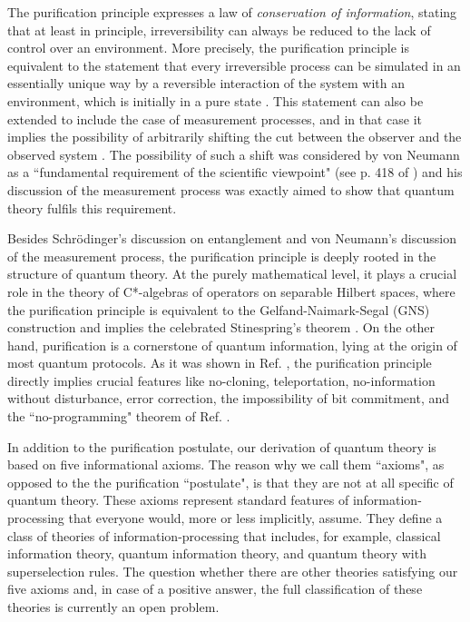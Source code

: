 \documentclass[12pt,aps,pra,showpacs,groupedaddress]{revtex4-1}
\begin{document}
The purification principle expresses a law of \emph{conservation of information}, stating that at
least in principle, irreversibility can always be reduced to the lack of control over an
environment. More precisely, the purification principle is equivalent to the statement that every
irreversible process can be simulated in an essentially unique way by a reversible interaction of
the system with an environment, which is initially in a pure state \cite{purification}.  This
statement can also be extended to include the case of measurement processes, and in that case it
implies the possibility of arbitrarily shifting the cut between the observer and the observed system
\cite{purification}.  The possibility of such a shift was considered by von Neumann as a
``fundamental requirement of the scientific viewpoint" (see p. 418 of \cite{von32}) and his
discussion of the measurement process was exactly aimed to show that quantum theory fulfils this
requirement.


Besides Schr\"odinger's discussion on entanglement and von Neumann's discussion of the measurement process, the purification principle is deeply rooted in
the structure of quantum theory.  At the purely mathematical level, it plays a crucial role in the
theory of C*-algebras of operators on separable Hilbert spaces, where the purification principle is
equivalent to the Gelfand-Naimark-Segal (GNS) construction \cite{arveson} and implies the celebrated
Stinespring's theorem \cite{stine}.  On the other hand, purification is a cornerstone of quantum information, lying at the origin of most
quantum protocols.  As it was shown in Ref. \cite{purification}, the purification 
principle directly implies crucial features like no-cloning, teleportation, no-information without
disturbance, error correction, the impossibility of bit commitment, and the ``no-programming"
theorem of Ref. \cite{no-prog}. 


In addition to the purification postulate, our derivation of quantum theory is based on five
informational axioms.  The reason why we call them ``axioms", as opposed to the the purification
``postulate", is that they are not at all specific of quantum theory.  These axioms represent 
standard features of information-processing that everyone would,
more or less implicitly, assume. They define a class of theories of information-processing 
that includes, for example, classical information theory, quantum information theory, and quantum theory with superselection rules.  The question 
whether there are other theories satisfying our five axioms  and, in case of a positive answer, the full classification of these theories is currently an open problem. 
\end{document}
